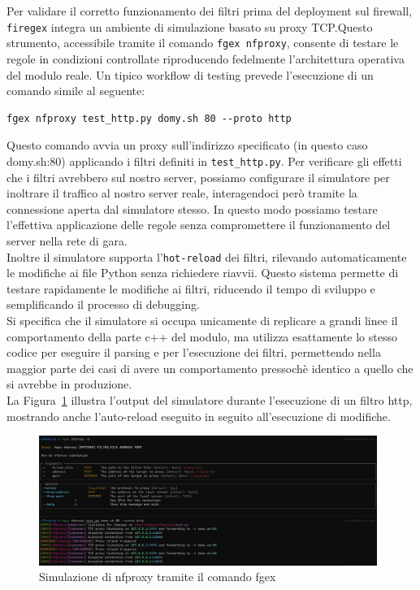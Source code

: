 Per validare il corretto funzionamento dei filtri prima del deployment sul firewall, \texttt{firegex} integra un ambiente di simulazione basato su proxy TCP.\@ Questo strumento, accessibile tramite il comando \texttt{fgex nfproxy}, consente di testare le regole in condizioni controllate riproducendo fedelmente l'architettura operativa del modulo reale. Un tipico workflow di testing prevede l'esecuzione di un comando simile al seguente:
\begin{listing}[H]
    \begin{verbatim}
fgex nfproxy test_http.py domy.sh 80 --proto http
\end{verbatim}
\end{listing}

Questo comando avvia un proxy sull'indirizzo specificato (in questo caso domy.sh:80) applicando i filtri definiti in \texttt{test\_http.py}.
Per verificare gli effetti che i filtri avrebbero sul nostro server, possiamo configurare il simulatore per inoltrare il traffico al nostro server reale, interagendoci però tramite la connessione aperta dal simulatore stesso. In questo modo possiamo testare l'effettiva applicazione delle regole senza compromettere il funzionamento del server nella rete di gara.  \\
Inoltre il simulatore supporta l'\texttt{hot-reload} dei filtri, rilevando automaticamente le modifiche ai file Python senza richiedere riavvii. Questo sistema permette di testare rapidamente le modifiche ai filtri, riducendo il tempo di sviluppo e semplificando il processo di debugging.\\
Si specifica che il simulatore si occupa unicamente di replicare a grandi linee il comportamento della parte c++ del modulo, ma utilizza esattamente lo stesso codice per eseguire il parsing e per l'esecuzione dei filtri, permettendo nella maggior parte dei casi di avere un comportamento pressochè identico a quello che si avrebbe in produzione.\\
La Figura~\ref{fig:nfproxy_sim} illustra l'output del simulatore durante l'esecuzione di un filtro http, mostrando anche l'auto-reload eseguito in seguito all'esecuzione di modifiche.

\begin{figure}[H]
    \centering
    \includegraphics[width=0.98\textwidth]{images/chapter3/nfproxy_sim.png}
    \caption{Simulazione di nfproxy tramite il comando fgex}\label{fig:nfproxy_sim}
\end{figure}

